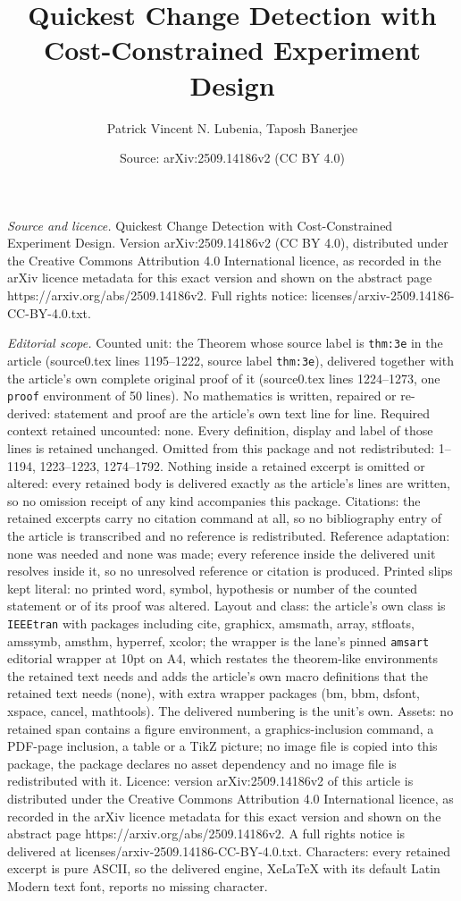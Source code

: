 \documentclass[10pt,a4paper]{amsart}
\title[Quickest Change Detection with Cost-Constrained Experiment D]{Quickest Change Detection with Cost-Constrained Experiment Design}
\author{Patrick Vincent N. Lubenia, Taposh Banerjee}
\date{Source: arXiv:2509.14186v2 (CC BY 4.0)}
\begin{document}
\maketitle

\noindent\emph{Source and licence.} Quickest Change Detection with Cost-Constrained Experiment Design. Version arXiv:2509.14186v2 (CC BY 4.0), distributed under the Creative Commons Attribution 4.0 International licence, as recorded in the arXiv licence metadata for this exact version and shown on the abstract page https://arxiv.org/abs/2509.14186v2. Full rights notice: licenses/arxiv-2509.14186-CC-BY-4.0.txt.\par\smallskip

\noindent\textit{Editorial scope.} Counted unit: the Theorem whose source label is \texttt{thm:3e} in the article (source0.tex lines 1195--1222, source label \texttt{thm:3e}), delivered together with the article's own complete original proof of it (source0.tex lines 1224--1273, one \texttt{proof} environment of 50 lines). No mathematics is written, repaired or re-derived: statement and proof are the article's own text line for line. Required context retained uncounted: none. Every definition, display and label of those lines is retained unchanged. Omitted from this package and not redistributed: 1--1194, 1223--1223, 1274--1792. Nothing inside a retained excerpt is omitted or altered: every retained body is delivered exactly as the article's lines are written, so no omission receipt of any kind accompanies this package. Citations: the retained excerpts carry no citation command at all, so no bibliography entry of the article is transcribed and no reference is redistributed. Reference adaptation: none was needed and none was made; every reference inside the delivered unit resolves inside it, so no unresolved reference or citation is produced. Printed slips kept literal: no printed word, symbol, hypothesis or number of the counted statement or of its proof was altered. Layout and class: the article's own class is \texttt{IEEEtran} with packages including cite, graphicx, amsmath, array, stfloats, amssymb, amsthm, hyperref, xcolor; the wrapper is the lane's pinned \texttt{amsart} editorial wrapper at 10pt on A4, which restates the theorem-like environments the retained text needs and adds the article's own macro definitions that the retained text needs (none), with extra wrapper packages (bm, bbm, dsfont, xspace, cancel, mathtools). The delivered numbering is the unit's own. Assets: no retained span contains a figure environment, a graphics-inclusion command, a PDF-page inclusion, a table or a TikZ picture; no image file is copied into this package, the package declares no asset dependency and no image file is redistributed with it. Licence: version arXiv:2509.14186v2 of this article is distributed under the Creative Commons Attribution 4.0 International licence, as recorded in the arXiv licence metadata for this exact version and shown on the abstract page https://arxiv.org/abs/2509.14186v2. A full rights notice is delivered at licenses/arxiv-2509.14186-CC-BY-4.0.txt. Characters: every retained excerpt is pure ASCII, so the delivered engine, XeLaTeX with its default Latin Modern text font, reports no missing character.
\end{document}
